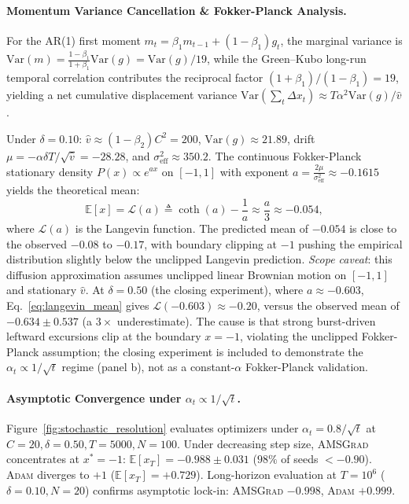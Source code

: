 \paragraph{Momentum Variance Cancellation \& Fokker-Planck Analysis.}
For the AR(1) first moment $m_t = \beta_1 m_{t-1} + (1-\beta_1) g_t$, the marginal variance is $\text{Var}(m) = \frac{1-\beta_1}{1+\beta_1}\text{Var}(g) = \text{Var}(g)/19$, while the Green--Kubo long-run temporal correlation contributes the reciprocal factor $(1+\beta_1)/(1-\beta_1)=19$, yielding a net cumulative displacement variance $\text{Var}(\sum_t \Delta x_t) \approx T\alpha^2\text{Var}(g)/\hat{v}$.

Under $\delta=0.10$: $\hat{v} \approx (1-\beta_2)C^2 = 200$, $\text{Var}(g) \approx 21.89$, drift $\mu = -\alpha\delta T/\sqrt{\hat{v}} = -28.28$, and $\sigma_{\text{eff}}^2 \approx 350.2$. The continuous Fokker-Planck stationary density $P(x) \propto e^{a x}$ on $[-1, 1]$ with exponent $a = \frac{2\mu}{\sigma_{\text{eff}}^2} \approx -0.1615$ yields the theoretical mean:
\begin{equation}
    \mathbb{E}[x] = \mathcal{L}(a) \triangleq \coth(a) - \frac{1}{a} \approx \frac{a}{3} \approx -0.054,
    \label{eq:langevin_mean}
\end{equation}
where $\mathcal{L}(a)$ is the Langevin function. The predicted mean of $-0.054$ is close to the observed $-0.08$ to $-0.17$, with boundary clipping at $-1$ pushing the empirical distribution slightly below the unclipped Langevin prediction. \emph{Scope caveat}: this diffusion approximation assumes unclipped linear Brownian motion on $[-1, 1]$ and stationary $\hat{v}$. At $\delta=0.50$ (the closing experiment), where $a \approx -0.603$, Eq.~\eqref{eq:langevin_mean} gives $\mathcal{L}(-0.603) \approx -0.20$, versus the observed mean of $-0.634 \pm 0.537$ (a $3\times$ underestimate). The cause is that strong burst-driven leftward excursions clip at the boundary $x=-1$, violating the unclipped Fokker-Planck assumption; the closing experiment is included to demonstrate the $\alpha_t \propto 1/\sqrt{t}$ regime (panel b), not as a constant-$\alpha$ Fokker-Planck validation.

\paragraph{Asymptotic Convergence under $\alpha_t \propto 1/\sqrt{t}$.}
Figure~\ref{fig:stochastic_resolution} evaluates optimizers under $\alpha_t = 0.8/\sqrt{t}$ at $C=20, \delta=0.50, T=5000, N=100$. Under decreasing step size, \textsc{AMSGrad} concentrates at $x^*=-1$: $\mathbb{E}[x_T]=-0.988 \pm 0.031$ ($98\%$ of seeds $< -0.90$). \textsc{Adam} diverges to $+1$ ($\mathbb{E}[x_T]=+0.729$). Long-horizon evaluation at $T=10^6$ ($\delta=0.10, N=20$) confirms asymptotic lock-in: \textsc{AMSGrad} $-0.998$, \textsc{Adam} $+0.999$.

